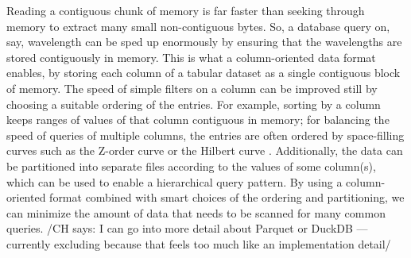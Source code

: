 \documentclass[12pt]{article}
\newcommand{\CH}[1]{{\color{blue!70!black} /CH says: #1/}}
\begin{document}
Reading a contiguous chunk of memory is far faster than seeking through memory to extract many small non-contiguous bytes.
So, a database query on, say, wavelength can be sped up enormously by ensuring that the wavelengths are stored contiguously in memory.
This is what a column-oriented data format enables, by storing each column of a tabular dataset as a single contiguous block of memory.
The speed of simple filters on a column can be improved still by choosing a suitable ordering of the entries.
For example, sorting by a column keeps ranges of values of that column contiguous in memory;
for balancing the speed of queries of multiple columns, the entries are often ordered by space-filling curves such as the Z-order curve \citep{Morton1966-Zcurve} or the Hilbert curve \citep{Lawder&King2001-Hilbert}.
Additionally, the data can be partitioned into separate files according to the values of some column(s), which can be used to enable a hierarchical query pattern.
By using a column-oriented format combined with smart choices of the ordering and partitioning, we can minimize the amount of data that needs to be scanned for many common queries.
\CH{I can go into more detail about Parquet or DuckDB --- currently excluding because that feels too much like an implementation detail}
\end{document}
